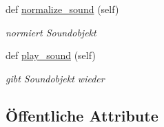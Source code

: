 \begin{DoxyCompactItemize}
def \mbox{\hyperlink{classsounddata_1_1_sounddata_a623c2b2a5e126347893864ffc09246d6}{normalize\+\_\+sound}} (self)
\begin{DoxyCompactList}\small\item\em normiert Soundobjekt \end{DoxyCompactList}\item 
def \mbox{\hyperlink{classsounddata_1_1_sounddata_aacf5b956e13132ce48a550852b6e9a96}{play\+\_\+sound}} (self)
\begin{DoxyCompactList}\small\item\em gibt Soundobjekt wieder \end{DoxyCompactList}\end{DoxyCompactItemize}
\subsection*{Öffentliche Attribute}
